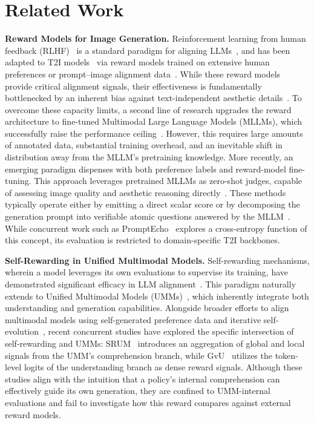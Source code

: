 \section{Related Work}
\label{sec:related_work}
\noindent \textbf{Reward Models for Image Generation.}
Reinforcement learning from human feedback (RLHF)~\cite{ouyang2022training} is a standard paradigm for aligning LLMs~\cite{gao2024honestllm,shao2024deepseekmath}, and has been adapted to T2I models~\cite{black2023training} via reward models trained on extensive human preferences or prompt–image alignment data~\cite{imagereward, visionreward, pickscore, imagereward, hpsv3}. While these reward models provide critical alignment signals, their effectiveness is fundamentally bottlenecked by an inherent bias against text-independent aesthetic details~\cite{ba2025enhancing}. To overcome these capacity limits, a second line of research upgrades the reward architecture to fine-tuned Multimodal Large Language Models (MLLMs), which successfully raise the performance ceiling~\cite{visionreward, rewarddance, gong2025onereward}. However, this requires large amounts of annotated data, substantial training overhead, and an inevitable shift in distribution away from the MLLM's pretraining knowledge. More recently, an emerging paradigm dispenses with both preference labels and reward-model fine-tuning. 
This approach leverages pretrained MLLMs as zero-shot judges, capable of assessing image quality and aesthetic reasoning directly~\cite{jiang2025multimodal, schoepp2025evolving}. These methods typically operate either by emitting a direct scalar score or by decomposing the generation prompt into verifiable atomic questions answered by the MLLM~\cite{alphagrpo}. While concurrent work such as PromptEcho~\cite{liu2026promptecho} explores a cross-entropy function of this concept, its evaluation is restricted to domain-specific T2I backbones.

\noindent \textbf{Self-Rewarding in Unified Multimodal Models.}
Self-rewarding mechanisms, wherein a model leverages its own evaluations to supervise its training, have demonstrated significant efficacy in LLM alignment~\cite{yuan2024self, wu2025meta, sun2023salmon}. This paradigm naturally extends to Unified Multimodal Models (UMMs)~\cite{team2024chameleon, xie2024show, wu2024next, zhao2025unified}, which inherently integrate both understanding and generation capabilities. Alongside broader efforts to align multimodal models using self-generated preference data and iterative self-evolution~\cite{tan2025beyond, jiang2024modality}, recent concurrent studies have explored the specific intersection of self-rewarding and UMMs: SRUM~\cite{jin2025srum} introduces an aggregation of global and local signals from the UMM's comprehension branch, while GvU~\cite{pan2026learning} utilizes the token-level logits of the understanding branch as dense reward signals. Although these studies align with the intuition that a policy's internal comprehension can effectively guide its own generation, they are confined to UMM-internal evaluations and fail to investigate how this reward compares against external reward models.
